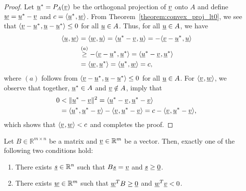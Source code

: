 \begin{proof}
Let $\underline{u}^* = P_A (\underline{v})$ be the orthogonal projection of $\underline{v}$ onto $A$ and define $\underline{w} = \underline{u}^* - \underline{v}$ and $c= {\langle  \underline{u}^*  \mskip1mu ,  \underline{w}  \rangle}$.
From Theorem~\ref{theorem:convex_proj_lt0}, we see that ${\langle  \underline{v}-\underline{u}^*  \mskip1mu ,  \underline{u}-\underline{u}^*  \rangle} \leq 0$ for all $\underline{u} \in A$.
Thus, for all $\underline{u}\in A$, we have
\begin{align*}
{\langle  \underline{u}  \mskip1mu ,  \underline{w}  \rangle}
&= {\langle  \underline{w}  \mskip1mu ,  \underline{u}  \rangle}
= {\langle  \underline{u}^* - \underline{v}  \mskip1mu ,  \underline{u}  \rangle}
= - {\langle  \underline{v} - \underline{u}^*  \mskip1mu ,  \underline{u}  \rangle} \\
&\stackrel{(a)}{\geq} - {\langle  \underline{v} - \underline{u}^*  \mskip1mu ,  \underline{u}^*  \rangle}
= {\langle  \underline{u}^* - \underline{v}  \mskip1mu ,  \underline{u}^*  \rangle}
\\
&= {\langle  \underline{w}  \mskip1mu ,  \underline{u}^*  \rangle}
= {\langle  \underline{u}^*  \mskip1mu ,  \underline{w}  \rangle}
= c,
\end{align*}
where $(a)$ follows from ${\langle  \underline{v}-\underline{u}^*  \mskip1mu ,  \underline{u}-\underline{u}^*  \rangle} \leq 0$ for all $\underline{u} \in A$.
For ${\langle  \underline{v}  \mskip1mu ,  \underline{w}  \rangle}$, we observe that together, $\underline{u}^* \in A$ and $\underline{v} \notin A$, imply that
\begin{align*}
0 &< \| \underline{u}^* - \underline{v} \|^2
= {\langle  \underline{u}^* - \underline{v}  \mskip1mu ,  \underline{u}^* - \underline{v}  \rangle} \\
&= {\langle  \underline{u}^*  \mskip1mu ,  \underline{u}^* - \underline{v}  \rangle} - {\langle   \underline{v}  \mskip1mu ,  \underline{u}^* - \underline{v}  \rangle}
= c - {\langle   \underline{v}  \mskip1mu ,  \underline{u}^* - \underline{v}  \rangle},
\end{align*}
which shows that ${\langle  \underline{v}  \mskip1mu ,  \underline{w}  \rangle} < c$ and completes the proof.
\end{proof}

\begin{corollary}
Let $B \in \mathbb{R}^{m \times n}$ be a matrix and $\underline{v} \in \mathbb{R}^m$ be a vector.
Then, exactly one of the following two conditions hold:
\begin{enumerate}
\item There exists $\underline{s} \in \mathbb{R}^n$ such that $B \underline{s} = \underline{v}$ and $\underline{s} \geq \underline{0}$.
\item There exists $\underline{w} \in \mathbb{R}^m$ such that $\underline{w}^T B \geq \underline{0}$ and $\underline{w}^T \underline{v} < 0$.
\end{enumerate}
\end{corollary}

